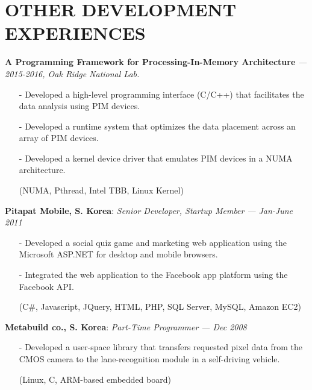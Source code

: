 \section{OTHER DEVELOPMENT EXPERIENCES} 
\vspace{0.03in}

  {\bf A Programming Framework for Processing-In-Memory Architecture}
   {\it \footnotesize --- 2015-2016, Oak Ridge National Lab.}
   \begin{itemize}[leftmargin=*]
    \setlength\itemsep{-0.02in}
    \item[-] Developed a high-level programming interface (C/C++) that
             facilitates the data analysis using PIM devices.
    \item[-] Developed a runtime system that optimizes the data placement across an array of
             PIM devices.
    \item[-] Developed a kernel device driver that emulates PIM devices in a NUMA architecture.
    \item[] {\small(NUMA, Pthread, Intel TBB, Linux Kernel)}
   \end{itemize}

  \vspace{-0.15in}
  {\bf Pitapat Mobile, S. Korea}: \emph{Senior Developer, Startup Member}
    {\it \footnotesize --- Jan-June 2011}
    \begin{itemize}[leftmargin=*]
    \setlength\itemsep{-0.02in}
     \item[-] Developed a social quiz game and marketing web application using 
              the Microsoft ASP.NET for desktop and mobile browsers.
     \item[-] Integrated the web application to the Facebook app platform using the Facebook API.
     \item[]  {\small(C\#, Javascript, JQuery, HTML, PHP, SQL Server, MySQL, Amazon EC2)}
\end{itemize}

  \vspace{-0.15in}
  {\bf Metabuild co., S. Korea}: \emph{Part-Time Programmer}
    {\it \footnotesize --- Dec 2008}
    \begin{itemize}[leftmargin=*]
    \setlength\itemsep{-0.02in}
     \item[-] Developed a user-space library that transfers requested pixel data
              from the CMOS camera
              to the lane-recognition module in a self-driving vehicle.
     \item[] {\small(Linux, C, ARM-based embedded board)}
\end{itemize}

